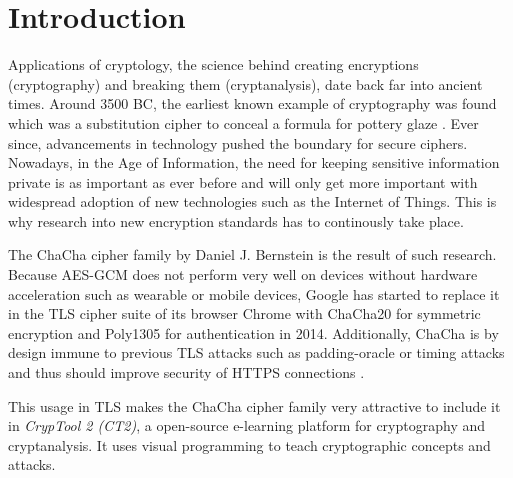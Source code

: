 \chapter{Introduction}

Applications of cryptology, the science behind creating encryptions (cryptography) and breaking them (cryptanalysis), date back far into ancient times. Around 3500 BC, the earliest known example of  cryptography was found which was a substitution cipher to conceal a formula for pottery glaze \cite{history}. Ever since, advancements in technology pushed the boundary for secure ciphers. Nowadays, in the Age of Information, the need for keeping sensitive information private is as important as ever before and will only get more important with widespread adoption of new technologies such as the Internet of Things. This is why research into new encryption standards has to continously take place.

The ChaCha cipher family by Daniel J. Bernstein is the result of such research. Because AES-GCM does not perform very well on devices without hardware acceleration such as wearable or mobile devices, Google has started to replace it in the TLS cipher suite of its browser Chrome with ChaCha20 for symmetric encryption and Poly1305 for authentication in 2014. Additionally, ChaCha is by design immune to previous TLS attacks such as padding-oracle or timing attacks and thus should improve security of HTTPS connections \cite{googlesecurityblog}.

This usage in TLS makes the ChaCha cipher family very attractive to include it in \textit{CrypTool 2 (CT2)}, a open-source e-learning platform for cryptography and cryptanalysis. It uses visual programming to teach cryptographic concepts and attacks.